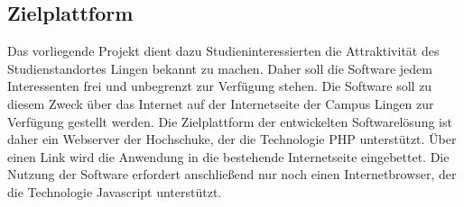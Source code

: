 \subsection{Zielplattform}
\label{sec:Zielplattform}

Das vorliegende Projekt dient dazu Studieninteressierten die Attraktivität des Studienstandortes Lingen bekannt zu machen. Daher soll die Software jedem Interessenten frei und unbegrenzt zur Verfügung stehen.
Die Software soll zu diesem Zweck über das Internet auf der Internetseite der Campus Lingen zur Verfügung gestellt werden.
Die Zielplattform der entwickelten Softwarelösung ist daher ein Webserver der Hochschuke, der die Technologie PHP unterstützt.
Über einen Link wird die Anwendung in die bestehende Internetseite eingebettet.
Die Nutzung der Software erfordert anschließend nur noch einen Internetbrowser, der die Technologie Javascript unterstützt.

